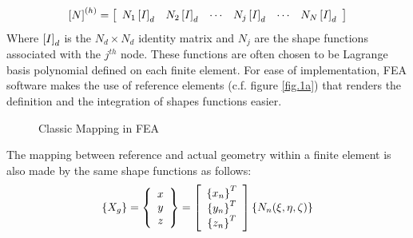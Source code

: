 \begin{equation}
\label{eq.1.12}
\left[{N}\right]^{(h)}=\left[ \begin{array}{cccccc}
N_1\left[{I}\right]_d&N_2\left[{I}\right]_d& \cdots&N_j\left[{I}\right]_d&\cdots&N_N\left[{I}\right]_d
\end{array} \right]
\end{equation}
Where $\left[{I}\right]_d$ is the $N_d \times N_d$ identity matrix and $N_j$ are the shape functions associated with the $j^{th}$ node. These functions are often chosen to be Lagrange basis polynomial defined on each finite element. For ease of implementation, FEA software makes the use of reference elements (c.f. figure \ref{fig.1a}) that renders the definition and the integration of shapes functions easier. 
\begin{figure}[!ht]
     \caption{Classic Mapping in FEA}
     \label{fig.1.2}
   \end{figure}
The mapping between reference and actual geometry within a finite element is also made by the same shape functions as follows:
\begin{equation}
\label{eq.1.16}
\left\lbrace{X_g}\right \rbrace=\left\lbrace{\begin{array}{c}
x\\y\\z
\end{array}}\right \rbrace=\left[{\begin{array}{c}\left\lbrace{x_n}\right \rbrace^T\\\left\lbrace{y_n}\right \rbrace^T\\\left\lbrace{z_n}\right \rbrace^T\end{array}}\right]\left\lbrace{N_n(\xi,\eta,\zeta)}\right \rbrace
\end{equation}
